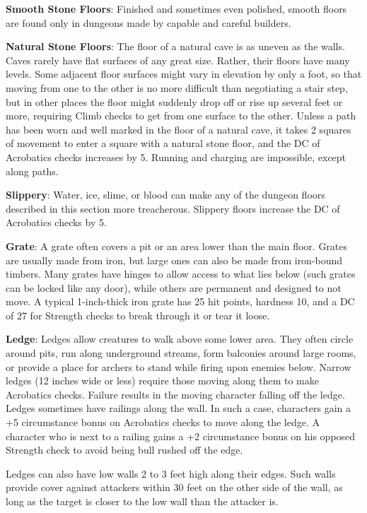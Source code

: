 \textbf{Smooth Stone Floors}: Finished and sometimes even polished, smooth floors are found only in dungeons made by capable and careful builders. 
				
\textbf{Natural Stone Floors}: The floor of a natural cave is as uneven as the walls. Caves rarely have flat surfaces of any great size. Rather, their floors have many levels. Some adjacent floor surfaces might vary in elevation by only a foot, so that moving from one to the other is no more difficult than negotiating a stair step, but in other places the floor might suddenly drop off or rise up several feet or more, requiring Climb checks to get from one surface to the other. Unless a path has been worn and well marked in the floor of a natural cave, it takes 2 squares of movement to enter a square with a natural stone floor, and the DC of Acrobatics checks increases by 5. Running and charging are impossible, except along paths.
				
\textbf{Slippery}: Water, ice, slime, or blood can make any of the dungeon floors described in this section more treacherous. Slippery floors increase the DC of Acrobatics checks by 5. 
				
\textbf{Grate}: A grate often covers a pit or an area lower than the main floor. Grates are usually made from iron, but large ones can also be made from iron-bound timbers. Many grates have hinges to allow access to what lies below (such grates can be locked like any door), while others are permanent and designed to not move. A typical 1-inch-thick iron grate has 25 hit points, hardness 10, and a DC of 27 for Strength checks to break through it or tear it loose.
				
\textbf{Ledge}: Ledges allow creatures to walk above some lower area. They often circle around pits, run along underground streams, form balconies around large rooms, or provide a place for archers to stand while firing upon enemies below. Narrow ledges (12 inches wide or less) require those moving along them to make Acrobatics checks. Failure results in the moving character falling off the ledge. Ledges sometimes have railings along the wall. In such a case, characters gain a +5 circumstance bonus on Acrobatics checks to move along the ledge. A character who is next to a railing gains a +2 circumstance bonus on his opposed Strength check to avoid being bull rushed off the edge.
				
Ledges can also have low walls 2 to 3 feet high along their edges. Such walls provide cover against attackers within 30 feet on the other side of the wall, as long as the target is closer to the low wall than the attacker is.
				
